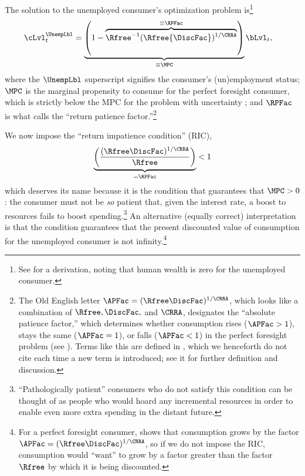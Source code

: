 \documentclass{econark}
\begin{document}
The solution to the unemployed consumer's optimization problem
is\footnote{See  for a derivation, noting that human wealth is zero for the unemployed consumer.} 
\begin{equation}\begin{gathered}\begin{aligned}
        \cLvl^{\UnempLbl}_{t} & =  \underbrace{\left(1-\overbrace{\Rfree ^{-1}(\Rfree{\DiscFac})^{1/\CRRA}}^{\equiv \RPFac}\right)}_{\equiv \MPC} \bLvl_{t} \label{eq:cpfinfhorunemp} %
,
\end{aligned}\end{gathered}\end{equation}
where the $\UnempLbl$ superscript signifies the consumer's (un)employment
status; $\MPC$ is the marginal propensity to consume for the perfect
foresight consumer, which is strictly below the MPC for the problem
with uncertainty \citep{carroll&kimball:concavity}; and $\RPFac$ is
what \cite{BufferStockTheory} calls the ``return patience factor.''\footnote{The Old English letter $\APFac = (\Rfree \DiscFac)^{1/\CRRA}$, which looks like a combination of $\Rfree, \DiscFac, $ and $\CRRA$, designates the ``absolute patience factor,'' which determines whether consumption rises ($\APFac > 1$), stays the same ($\APFac = 1$), or falls ($\APFac < 1$) in the perfect foresight problem (see ).  Terms like this are defined in \cite{BufferStockTheory}, which we henceforth do not cite each time a new term is introduced; see it for further definition and discussion.}


\indent We now impose the ``return impatience condition'' (RIC),
\begin{equation}\begin{gathered}\begin{aligned}
  \underbrace{\left(\frac{(\Rfree \DiscFac)^{1/\CRRA}}{\Rfree}\right)}_{= \RPFac} < 1 \label{eq:RIC}
\end{aligned}\end{gathered}\end{equation}
which deserves its name because it is the condition that guarantees that $\MPC
> 0$: the consumer must not be {\it so} patient that, given the interest rate, a boost to
resources fails to boost spending.\footnote{``Pathologically patient'' consumers who do not satisfy this condition can be thought of as people who would hoard any incremental resources in order to enable even more extra spending in the distant future.}
An alternative (equally correct)
interpretation is that the condition guarantees that the present discounted value of consumption for the unemployed consumer is not infinity.\footnote{For a perfect
foresight consumer,  shows that consumption grows by the factor
$\APFac = (\Rfree\DiscFac)^{1/\CRRA}$, so if we do not impose the RIC, consumption would ``want'' to grow by
a factor greater than the factor $\Rfree$ by which it is being
discounted.}  
\end{document}
